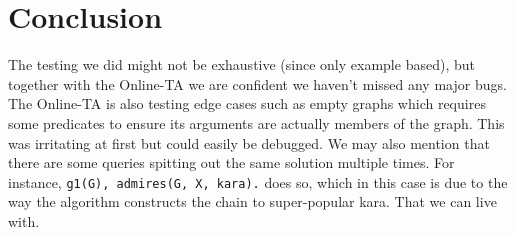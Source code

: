 \documentclass{article}
\begin{document}
\section{Conclusion}
The testing we did might not be exhaustive (since only example based), but together with the Online-TA
we are confident we haven't missed any major bugs. The Online-TA is also testing
edge cases such as empty graphs which requires some predicates to ensure its
arguments are actually members of the graph. This was irritating at first but
could easily be debugged. We may also mention that there are some queries spitting out the same
solution multiple times. For instance, \texttt{g1(G), admires(G, X, kara).} does so,
which in this case is due to the way the algorithm constructs the chain to super-popular kara.
That we can live with.
\end{document}
